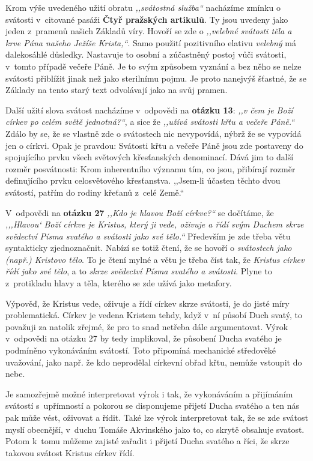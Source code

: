Krom výše uvedeného užití obratu \textit{,,svátostná služba``} nacházíme zmínku
o svátosti v~citované pasáži \textbf{Čtyř pražských artikulů}. Ty jsou uvedeny jako jeden
z~pramenů našich Základů víry. Hovoří se zde o \textit{,,velebné svátosti těla a
krve Pána našeho Ježíše Krista,``}. Samo použití pozitivního elativu
\textit{velebný} má dalekosáhlé důsledky. Nastavuje to osobní a zúčastněný
postoj vůči svátosti, v~tomto případě večeře Páně. Je to svým způsobem vyznání a
bez něho se nelze svátosti přiblížit jinak než jako sterilnímu pojmu. Je proto
nanejvýš šťastné, že se Základy na tento starý text odvolávají jako na svůj
pramen.

Další užití slova svátost nacházíme v~odpovědi na \textbf{otázku 13}: \textit{,,v čem je
Boží církev po celém světě jednotná?{}``}, a sice že \textit{,,užívá svátosti křtu
a večeře Páně.``} Zdálo by se, že se vlastně zde o svátostech nic nevypovídá,
nýbrž že se vypovídá jen o církvi. Opak je pravdou: Svátosti křtu a večeře Páně
jsou zde postaveny do spojujícího prvku všech světových křesťanských denominací.
Dává jim to další rozměr posvátnosti: Krom inherentního významu tím, co jsou,
přibírají rozměr definujícího prvku celosvětového křesťanstva. ,,Jsem-li účasten
těchto dvou svátostí, patřím do rodiny křeťanů z~celé Země.``

V~odpovědi na \textbf{otázku 27} \textit{,,Kdo je hlavou Boží církve?{}``} se dočítáme, že
\textit{,,{},Hlavou` Boží církve je Kristus, který ji vede, oživuje a řídí svým
Duchem skrze svědectví Písma svatého a svátosti jako své tělo.``} Především je
zde třeba větu syntakticky zjednoznačnit. Nabízí se totiž čtení, že se hovoří o
\textit{svátostech jako (např.) Kristovo tělo}. To je čtení mylné a větu je
třeba číst tak, že \textit{Kristus církev řídí jako své tělo}, a to
\textit{skrze svědectví Písma svatého a svátosti}. Plyne to z~protikladu hlavy a
těla, kterého se zde užívá jako metafory.

Výpověď, že Kristus vede, oživuje a řídí církev skrze svátosti, je do jisté míry
problematická. Církev je vedena Kristem tehdy, když v~ní působí Duch svatý, to
považuji za natolik zřejmé, že pro to snad netřeba dále argumentovat. Výrok
v~odpovědi na otázku 27 by tedy implikoval, že působení Ducha svatého je
podmíněno vykonáváním svátostí. Toto připomíná mechanické středověké uvažování,
jako např. že kdo neprodělal církevní obřad křtu, nemůže vstoupit do nebe.

Je samozřejmě možné interpretovat výrok i tak, že vykonáváním a přijímáním
svátostí s~upřímností a pokorou se disponujeme přijetí Ducha svatého a ten nás
pak může vést, oživovat a řídit. Také lze výrok interpretovat tak, že se zde
svátost myslí obecnější, v~duchu Tomáše Akvinského jako to, co skrytě obsahuje
svatost. Potom k~tomu můžeme zajisté zařadit i přijetí Ducha svatého a říci, že
skrze takovou svátost Kristus církev řídí.

